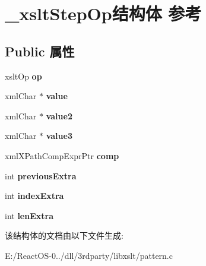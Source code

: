 \hypertarget{struct__xslt_step_op}{}\section{\+\_\+xslt\+Step\+Op结构体 参考}
\label{struct__xslt_step_op}
\subsection*{Public 属性}
\begin{DoxyCompactItemize}
\item 
\mbox{\label{struct__xslt_step_op_adb9887cab031acff4a270bcc82661ed4}} 
xslt\+Op {\bfseries op}
\item 
\mbox{\label{struct__xslt_step_op_a1e425cfb17b3ed68c8e8bd227df6d5bf}} 
xml\+Char $\ast$ {\bfseries value}
\item 
\mbox{\label{struct__xslt_step_op_aa530eba21a21fc72d5db4f9009e8ba13}} 
xml\+Char $\ast$ {\bfseries value2}
\item 
\mbox{\label{struct__xslt_step_op_ae346b55e8c38d1969382e51a4220f89f}} 
xml\+Char $\ast$ {\bfseries value3}
\item 
\mbox{\label{struct__xslt_step_op_a97aa2ae8bb2140feeec7610663fe653d}} 
xml\+X\+Path\+Comp\+Expr\+Ptr {\bfseries comp}
\item 
\mbox{\label{struct__xslt_step_op_a7e3a933e9c82c4b2e84b90935c8c7189}} 
int {\bfseries previous\+Extra}
\item 
\mbox{\label{struct__xslt_step_op_a0d9910b7fb305a2a2c4c178de1035e39}} 
int {\bfseries index\+Extra}
\item 
\mbox{\label{struct__xslt_step_op_a5d726969f9709c7bc98130384a37c1b9}} 
int {\bfseries len\+Extra}
\end{DoxyCompactItemize}


该结构体的文档由以下文件生成\+:\begin{DoxyCompactItemize}
\item 
E\+:/\+React\+O\+S-\/0../dll/3rdparty/libxslt/pattern.\+c\end{DoxyCompactItemize}

